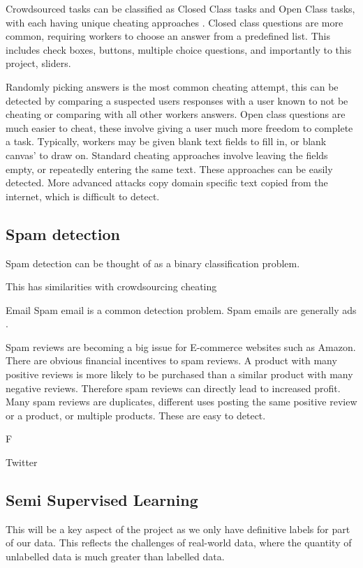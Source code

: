\documentclass{article}
\begin{document}
Crowdsourced tasks can be classified as Closed Class tasks and Open Class tasks, with each having unique cheating approaches \cite{eickhoff2013increasing}.
Closed class questions are more common, requiring workers to choose an answer from a predefined list.
This includes check boxes, buttons, multiple choice questions, and importantly to this project, sliders.

Randomly picking answers is the most common cheating attempt, this can be detected by comparing a suspected users responses with a user known to not be cheating or comparing with all other workers answers.
Open class questions are much easier to cheat, these involve giving a user much more freedom to complete a task.
Typically, workers may be given blank text fields to fill in, or blank canvas' to draw on.
Standard cheating approaches involve leaving the fields empty, or repeatedly entering the same text.
These approaches can be easily detected.
More advanced attacks copy domain specific text copied from the internet, which is difficult to detect. 

\subsection{Spam detection}

Spam detection can be thought of as a binary classification problem.
 
This has similarities with crowdsourcing cheating

Email
Spam email is a common detection problem.
Spam emails are generally ads \cite{jindal2007review}.

Spam reviews are becoming a big issue for E-commerce websites such as Amazon.
There are obvious financial incentives to spam reviews.
A product with many positive reviews is more likely to be purchased than a similar product with many negative reviews.
Therefore spam reviews can directly lead to increased profit.
Many spam reviews are duplicates, different uses posting the same positive review or a product, or multiple products.
These are easy to detect.


\cite{jindal2007review}F

Twitter




\subsection{Semi Supervised Learning}
This will be a key aspect of the project as we only have definitive labels for part of our data.
This reflects the challenges of real-world data, where the quantity of unlabelled data is much greater than labelled data.
\end{document}
